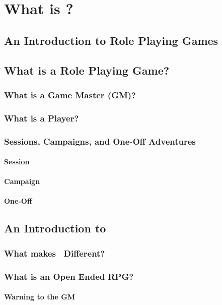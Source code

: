 
\part{What is {\slshape\gametitle}?}

\chapter{An Introduction to Role Playing Games}

\chapter{What is a Role Playing Game?}

\section{What is a Game Master (GM)?}

\section{What is a Player?}

\section{Sessions, Campaigns, and One-Off Adventures}

\subsection{Session}

\subsection{Campaign}

\subsection{One-Off}

\chapter{An Introduction to {\slshape\gametitle}}

\section{What makes \gametitle\ Different?}

\section{What is an Open Ended RPG?}

\subsection{Warning to the GM}
